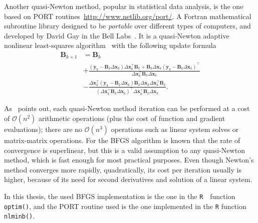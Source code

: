 Another quasi-Newton method, popular in statistical data analysis, is
the one based on PORT routines~\url{http://www.netlib.org/port/}. A
Fortran mathematical subroutine library designed to be \textit{portable}
over different types of computers, and developed by David Gay in the
Bell Labs~\cite{PORTreport}. It is a quasi-Newton adaptive nonlinear
least-squares algorithm~\cite{PORTpaper} with the following update
formula
\begin{align*}
  \mathbf{B}_{k+1} &= \mathbf{B}_{k}\\
                   &+ \frac{
                     \left(\mathbf{y}_{k} -
                     \mathbf{B}_{k}\Delta\mathbf{x}_{k}\right)
                     \Delta\mathbf{x}_{k}^{\top}\mathbf{B}_{k} +
                     \mathbf{B}_{k}\Delta\mathbf{x}_{k}
                     \left(\mathbf{y}_{k} -
                     \mathbf{B}_{k}\Delta\mathbf{x}_{k}\right)^{\top}}{
                     \Delta\mathbf{x}_{k}^{\top}\mathbf{B}_{k}
                     \Delta\mathbf{x}_{k}}\\
                   &- \frac{\Delta\mathbf{x}_{k}^{\top}
                     \left(\mathbf{y}_{k} -
                     \mathbf{B}_{k}\Delta\mathbf{x}_{k}\right)
                     \mathbf{B}_{k}\Delta\mathbf{x}_{k}
                     \Delta\mathbf{x}_{k}^{\top}\mathbf{B}_{k}}{
                     \left(\Delta\mathbf{x}_{k}^{\top}\mathbf{B}_{k}
                     \Delta\mathbf{x}_{k}\right)^{\top}
                     \Delta\mathbf{x}_{k}^{\top}\mathbf{B}_{k}
                     \Delta\mathbf{x}_{k}}.
\end{align*}

As~ points out, each quasi-Newton method
iteration can be performed at a cost of \(\mathcal{O}(n^{2})\)
arithmetic operations (plus the cost of function and gradient
evaluations); there are no \(\mathcal{O}(n^{3})\) operations such as
linear system solves or matrix-matrix operations. For the BFGS algorithm
is known that the rate of convergence is superlinear, but this is a
valid assumption to any quasi-Newton method, which is fast enough for
most practical purposes. Even though Newton's method converges more
rapidly, quadratically, its cost per iteration usually is higher,
because of its need for second derivatives and solution of a linear
system.

In this thesis, the used BFGS implementation is the one in the
\texttt{R}~\cite{R18}~function \texttt{optim()}, and the PORT routine
used is the one implemented in the \texttt{R} function
\texttt{nlminb()}.

